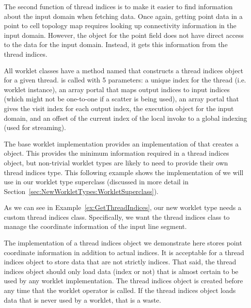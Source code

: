 The second function of thread indices is to make it easier to find information about the input domain when fetching data.
Once again, getting point data in a point to cell topology map requires looking up connectivity information in the input domain.
However, the  object for the point field does not have direct access to the data for the input domain.
Instead, it gets this information from the thread indices.

All worklet classes have a method named  that constructs a thread indices object for a given thread.
 is called with 5 parameters: a unique index for the thread (i.e. worklet instance), an array portal that maps output indices to input indices (which might not be one-to-one if a scatter is being used), an array portal that gives the visit index for each output index, the execution object for the input domain, and an offset of the current index of the local invoke to a global indexing (used for streaming).

The base worklet implementation provides an implementation of  that creates a  object.
This provides the minimum information required in a thread indices object, but non-trivial worklet types are likely to need to provide their own thread indices type.
This following example shows the implementation of  we will use in our worklet type superclass (discussed in more detail in Section~\ref{sec:NewWorkletTypes:WorkletSuperclass}).


As we can see in Example~\ref{ex:GetThreadIndices}, our new worklet type needs a custom thread indices class.
Specifically, we want the thread indices class to manage the coordinate information of the input line segment.

\begin{didyouknow}
  The implementation of a thread indices object we demonstrate here stores point coordinate information in addition to actual indices.
  It is acceptable for a thread indices object to store data that are not strictly indices.
  That said, the thread indices object should only load data (index or not) that is almost certain to be used by any worklet implementation.
  The thread indices object is created before any time that the worklet operator is called.
  If the thread indices object loads data that is never used by a worklet, that is a waste.
\end{didyouknow}

